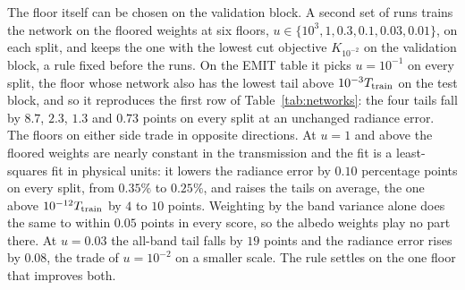 \documentclass[11pt]{article}
\theoremstyle{remark}
\newcommand{\1}{\mathbf{1}}
\begin{document}
The floor itself can be chosen on the validation block. A second set of runs trains the network on the floored
weights at six floors, $u\in\{10^{3},1,0.3,0.1,0.03,0.01\}$, on each split, and keeps the one with the lowest cut
objective $K_{10^{-2}}$ on the validation block, a rule fixed before the runs. On the EMIT table it picks $u=10^{-1}$ on
every split, the floor whose network also has the lowest tail above $10^{-3}T_{\rm train}$ on the test block, and so it
reproduces the first row of Table~\ref{tab:networks}: the four tails fall by $8.7$, $2.3$, $1.3$ and $0.73$ points on
every split at an unchanged radiance error. The floors on either side trade in opposite directions. At $u=1$ and above
the floored weights are nearly constant in the transmission and the fit is a least-squares fit in physical units: it
lowers the radiance error by $0.10$ percentage points on every split, from $0.35\%$ to $0.25\%$, and raises the tails
on average, the one above $10^{-12}T_{\rm train}$ by $4$ to $10$ points. Weighting by the band variance alone does the
same to within $0.05$ points in every score, so the albedo weights play no part there. At $u=0.03$ the all-band tail
falls by $19$ points and the radiance error rises by $0.08$, the trade of $u=10^{-2}$ on a smaller scale. The rule
settles on the one floor that improves both.

\begin{table}[t]
\centering\footnotesize\setlength{\tabcolsep}{3pt}
\resizebox{\textwidth}{!}{}
\caption{The EMIT table scored at four surface reflectances, from saved test predictions: the networks of
Table~\ref{tab:networks} (without the two failed evaluations) and the emulators of \cite{shmalo2} on the same ten splits
and test blocks. The radiance error and the 95th percentiles of $|\hat\rho-\rho|$ in points over all bands and on the
physical domain above $10^{-12}T_{\rm train}$ at $\rho=0.7$, the tail above $10^{-3}T_{\rm train}$ at four
reflectances, and the share of failed inversions on the physical domain at $\rho=0.7$. Every failed inversion counts
as an infinite error. Mean over splits $101$--$110$.}\label{tab:rhoemit}
\end{table}
\end{document}
